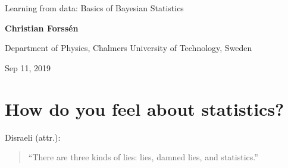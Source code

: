 \documentclass[%
oneside,                 %
final,                   %
10pt]{article}
\newenvironment{block_mdfboxadmon}[1][]{
\begin{block_mdfboxmdframed}[frametitle=#1]
}
{
\end{block_mdfboxmdframed}
}
\begin{document}

\newcommand{\exercisesection}[1]{\subsection*{#1}}







\thispagestyle{empty}

\begin{center}
{\LARGE\bf
\begin{spacing}{1.25}
Learning from data: Basics of Bayesian Statistics
\end{spacing}
}
\end{center}


\begin{center}
{\bf Christian Forssén}
\end{center}

    \begin{center}
\centerline{{\small Department of Physics, Chalmers University of Technology, Sweden}}
\end{center}
    

\begin{center}
Sep 11, 2019
\end{center}

\vspace{1cm}


\section{How do you feel about statistics?}

\begin{block_mdfboxadmon}[]
Disraeli (attr.): 

\begin{quote}
“There are three kinds of lies: lies, damned lies, and statistics.”
\end{quote}
\end{block_mdfboxadmon} %
\end{document}
